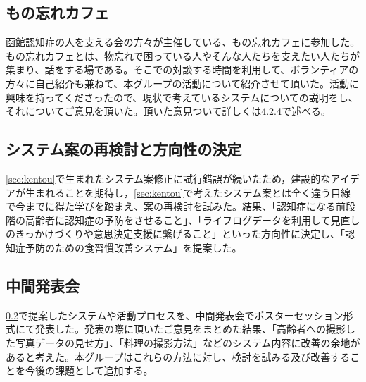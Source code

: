 \documentclass[../report]{subfiles}
\begin{document}
\subsection{もの忘れカフェ}
函館認知症の人を支える会の方々が主催している、もの忘れカフェに参加した。もの忘れカフェとは、物忘れで困っている人やそんな人たちを支えたい人たちが集まり、話をする場である。そこでの対談する時間を利用して、ボランティアの方々に自己紹介も兼ねて、本グループの活動について紹介させて頂いた。活動に興味を持ってくださったので、現状で考えているシステムについての説明をし、それについてご意見を頂いた。頂いた意見ついて詳しくは4.2.4で述べる。

\subsection{システム案の再検討と方向性の決定}\label{sec:saikentou}
\ref{sec:kentou}で生まれたシステム案修正に試行錯誤が続いたため，建設的なアイデアが生まれることを期待し，\ref{sec:kentou}で考えたシステム案とは全く違う目線で今までに得た学びを踏まえ、案の再検討を試みた。結果、「認知症になる前段階の高齢者に認知症の予防をさせること」、「ライフログデータを利用して見直しのきっかけづくりや意思決定支援に繋げること」といった方向性に決定し、「認知症予防のための食習慣改善システム」を提案した。

\subsection{中間発表会}
\ref{sec:saikentou}で提案したシステムや活動プロセスを、中間発表会でポスターセッション形式にて発表した。発表の際に頂いたご意見をまとめた結果、「高齢者への撮影した写真データの見せ方」、「料理の撮影方法」などのシステム内容に改善の余地があると考えた。本グループはこれらの方法に対し、検討を試みる及び改善することを今後の課題として追加する。
\end{document}
